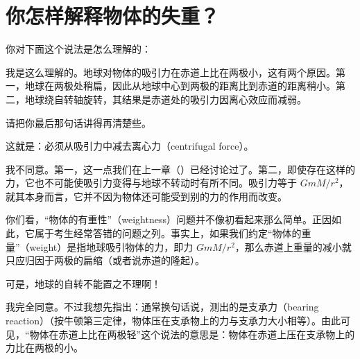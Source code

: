 
\chapter[你怎样解释物体的失重？]{你怎样解释物体的失重？\label{ch-09}}

\begin{dialogue}

\tchr 你对下面这个说法是怎么理解的：

\stdb 我是这么理解的。地球对物体的吸引力在赤道上比在两极小，这有两个原因。第一，地球在两极处稍扁，因此从地球中心到两极的距离比到赤道的距离稍小。第二，地球绕自转轴旋转，其结果是赤道处的吸引力因离心效应而减弱。

\stda 请把你最后那句话讲得再清楚些。

\stdb 这就是：必须从吸引力中减去离心力（centrifugal force）。

\stda 我不同意。第一，这一点我们在上一章（）已经讨论过了。第二，即使存在这样的力，它也不可能使吸引力变得与地球不转动时有所不同。吸引力等于 $GmM/r^{2}$，就其本身而言，它并不因为物体还可能受到别的力的作用而改变。

\tchr 你们看，“物体的有重性”（weightness）问题并不像初看起来那么简单。正因如此，它属于考生经常答错的问题之列。事实上，如果我们约定“物体的重量”（weight）是指地球吸引物体的力，即力 $GmM/r^{2}$，那么赤道上重量的减小就只应归因于两极的扁缩（或者说赤道的隆起）。

\stdb 可是，地球的自转不能置之不理啊！

\tchr 我完全同意。不过我想先指出：通常换句话说，测出的是支承力（bearing reaction）（按牛顿第三定律，物体压在支承物上的力与支承力大小相等）。由此可见，“物体在赤道上比在两极轻”这个说法的意思是：物体在赤道上压在支承物上的力比在两极的小。


\end{dialogue}
